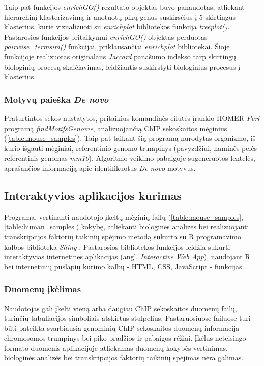 \documentclass[12pt]{article}
\begin{document}
Taip pat funkcijos \emph{enrichGO()} rezultato objektas buvo panaudotas,
atliekant hierarchinį klasterizavimą ir anotuotų pikų genus suskirsčius į
5 skirtingus klasterius, kurie vizualizuoti su \emph{enrichplot} bibliotekos
funkcija \emph{treeplot()}. Pastarosios funkcijos pritaikymui \emph{enrichGO()}
objektas perduotas \emph{pairwise\_termsim()} funkcijai, priklausančiai
\emph{enrichplot} bibliotekai. Šioje funkcijoje realizuotas originalaus
\emph{Jaccard} panašumo indekso tarp skirtingų biologinių procesų skaičiavimas,
leidžiantis suskirstyti biologinius procesus į klasterius.

\subsubsection*{Motyvų paieška \emph{De novo}}
Praturtintos sekos nustatytos, pritaikius komandinės eilutės įrankio
HOMER \cite{HOMER} \emph{Perl} programą \emph{findMotifsGenome}, analizuojančią
ChIP sekoskaitos mėginius (\ref{table:mouse_samples}). Taip pat taikant
šią programą nurodytas organizmo, iš kurio išgauti mėginiai, referentinio genomo
trumpinys (pavyzdžiui, naminės pelės referentinis genomas \emph{mm10}).
Algoritmo veikimo pabaigoje sugeneruotos lentelės, aprašančios informaciją
apie identifikuotus \emph{De novo} motyvus.

\newpage

\subsection*{Interaktyvios aplikacijos kūrimas}
Programa, vertinanti naudotojo įkeltų mėginių failų
(\ref{table:mouse_samples}, \ref{table:human_samples}) kokybę, atliekanti
biologines analizes bei realizuojanti transkripcijos faktorių taikinių spėjimo
metodą sukurta su R programavimo kalbos biblioteka \emph{Shiny} \cite{SHINY}.
Pastarosios bibliotekos funkcijos leidžia sukurti interaktyvias internetines
aplikacijas (angl. \emph{Interactive Web App}), naudojant R bei internetinių
puslapių kūrimo kalbų - HTML, CSS, JavaScript - funkcijas.

\subsubsection*{Duomenų įkėlimas}
Naudotojas gali įkelti vieną arba daugiau ChIP sekoskaitos duomenų failų,
turinčių tabuliacijos simboliais atskirtus stulpelius. Pastaruosiuose failuose
turi būti pateikta svarbiausia genominių ChIP sekoskaitos duomenų informacija -
chromosomos trumpinys bei piko pradžios ir pabaigos rėžiai. Įkėlus neteisingo
formato duomenis aplikacijoje atliekamas duomenų kokybės vertinimas, biologinės
analizės bei transkripcijos faktorių taikinių spėjimas nėra galimas.
\end{document}
